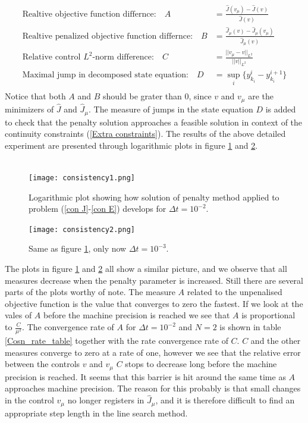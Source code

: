 \begin{align*}
\textrm{Realtive objective function differnce:}\quad A &= \frac{\hat{J}(v_{\mu})-\hat{J}(v)}{\hat{J}(v)}\\
\textrm{Realtive penalized objective function differnce:}\quad B &= \frac{\hat{J}_{\mu}(v)-\hat{J}_{\mu}(v_{\mu})}{\hat{J}_{\mu}(v)}\\
\textrm{Relative control $L^2$-norm difference:}\quad C&=\frac{||v_{\mu}-v||_ {L^2}}{||v||_{L^2}} \\
\textrm{Maximal jump in decomposed state equation:}\quad D&= \sup_i\{y_{k_i}^i-y_{k_i}^{i+1}\}\\
\end{align*}
Notice that both $A$ and $B$ should be grater than $0$, since $v$ and $v_{\mu}$ are the minimizers of $\hat J$ and $\hat J_ {\mu}$. The measure of jumps in the state equation $D$ is added to check that the penalty solution approaches a feasible solution in context of the continuity constraints (\ref{Extra constraints}). The results of the above detailed experiment are presented through logarithmic plots in figure \ref{Cons1_fig} and \ref{Cons2_fig}. 
\\
\\
\begin{figure}[!h]
\centering
\texttt{[image: consistency1.png]}
\caption{Logarithmic plot showing how solution of penalty method applied to problem (\ref{con J}-\ref{con E}) develops for $\Delta t = 10^{-2}$.}
\label{Cons1_fig}
\end{figure}
\begin{figure}[!h]
\centering
\texttt{[image: consistency2.png]}
\caption{Same as figure \ref{Cons1_fig}, only now $\Delta t = 10^{-3}$.}
\label{Cons2_fig}
\end{figure}
The plots in figure \ref{Cons1_fig} and \ref{Cons2_fig} all show a similar picture, and we observe that all measures decrease when the penalty parameter is increased. Still there are several parts of the plots worthy of note. The measure $A$ related to the unpenalised objective function is the value that converges to zero the fastest. If we look at the vales of $A$ before the machine precision is reached we see that $A$ is proportional to $\frac{C}{\mu^2}$. The convergence rate of $A$ for $\Delta t=10^{-2}$ and $N=2$ is shown in table \ref{Cosn_rate_table} together with the rate convergence rate of $C$. $C$ and the other measures converge to zero at a rate of one, however we see that the relative error between the controls $v$ and $v_{\mu}$ $C$ stops to decrease long before the machine precision is reached. It seems that this barrier is hit around the same time as $A$ approaches machine precision. The reason for this probably is that small changes in the control $v_{\mu}$ no longer registers in $\hat J_{\mu}$, and it is therefore difficult to find an appropriate step length in the line search method.
